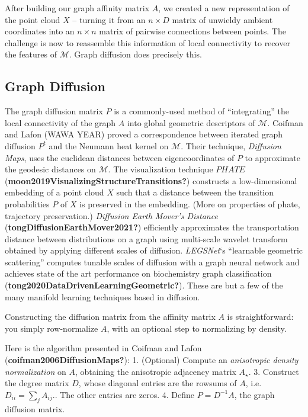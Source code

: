 \documentclass[
]{agujournal2019}
\begin{document}
After building our graph affinity matrix \(A\), we created a new
representation of the point cloud \(X\) -- turning it from an
\(n \times D\) matrix of unwieldy ambient coordinates into an
\(n \times n\) matrix of pairwise connections between points. The
challenge is now to reassemble this information of local connectivity to
recover the features of \(\mathcal{M}\). Graph diffusion does precisely
this.

\subsection{Graph Diffusion}\label{graph-diffusion}

The graph diffusion matrix \(P\) is a commonly-used method of
``integrating'' the local connectivity of the graph \(A\) into global
geometric descriptors of \(\mathcal{M}\). Coifman and Lafon (WAWA YEAR)
proved a correspondence between iterated graph diffusion \(P^t\) and the
Neumann heat kernel on \(\mathcal{M}\). Their technique, \emph{Diffusion
Maps}, uses the euclidean distances between eigencoordinates of \(P\) to
approximate the geodesic distances on \(\mathcal{M}\). The visualization
technique \(PHATE\) (\textbf{moon2019VisualizingStructureTransitions?})
constructs a low-dimensional embedding of a point cloud \(X\) such that
a distance between the transition probabilities \(P\) of \(X\) is
preserved in the embedding. (More on properties of phate, trajectory
preservation.) \emph{Diffusion Earth Mover's Distance}
(\textbf{tongDiffusionEarthMover2021?}) efficiently approximates the
transportation distance between distributions on a graph using
multi-scale wavelet transform obtained by applying different scales of
diffusion. \emph{LEGSNet}`s ``learnable geometric scattering'' computes
tunable scales of diffusion with a graph neural network and achieves
state of the art performance on biochemistry graph classification
(\textbf{tong2020DataDrivenLearningGeometric?}). These are but a few of
the many manifold learning techniques based in diffusion.

Constructing the diffusion matrix from the affinity matrix \(A\) is
straightforward: you simply row-normalize \(A\), with an optional step
to normalizing by density.

Here is the algorithm presented in Coifman and Lafon
(\textbf{coifman2006DiffusionMaps?}): 1. (Optional) Compute an
\emph{anisotropic density normalization} on \(A\), obtaining the
anisotropic adjacency matrix \(A_{\star}\). 3. Construct the degree
matrix \(D\), whose diagonal entries are the rowsums of \(A\),
i.e.~\(D_{ii} = \sum_{j}A_{ij}\).. The other entries are zeros. 4.
Define \(P = D^{-1} A\), the graph diffusion matrix.
\end{document}
